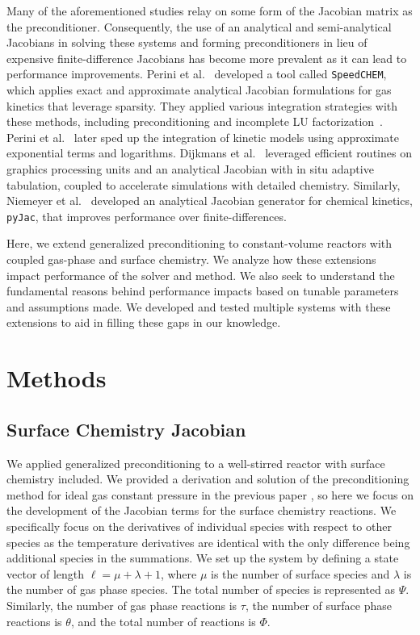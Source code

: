\documentclass[12pt]{ussci}
\def\nreactions{\Phi}
\def\gasreactions{\tau}
\def\surfreactions{\theta}
\def\nspecies{\Psi}
\def\gasspecies{\lambda}
\def\surfspecies{\mu}
\begin{document}
Many of the aforementioned studies relay on some form of the Jacobian matrix as the preconditioner.
Consequently, the use of an analytical and semi-analytical Jacobians in solving these systems and forming preconditioners in lieu of expensive finite-difference Jacobians has become more prevalent as it can lead to performance improvements.
Perini et al.~\cite{perini_analytical_2012} developed a tool called \texttt{SpeedCHEM}, which applies exact and approximate analytical Jacobian formulations for gas kinetics that leverage sparsity.
They applied various integration strategies with these methods, including preconditioning and incomplete LU factorization~\cite{perini_study_2014}.
Perini et al.~\cite{perini_fast_2018} later sped up the integration of kinetic models using approximate exponential terms and logarithms.
Dijkmans et al.~\cite{dijkmans_gpu_2014} leveraged efficient routines on graphics processing units and an analytical Jacobian with in situ adaptive tabulation, coupled to accelerate simulations with detailed chemistry.
Similarly, Niemeyer et al.~\cite{niemeyer_pyjac_2017} developed an analytical Jacobian generator for chemical kinetics, \texttt{pyJac}, that improves performance over finite-differences.

Here, we extend generalized preconditioning to constant-volume reactors with coupled gas-phase and surface chemistry.
We analyze how these extensions impact performance of the solver and method.
We also seek to understand the fundamental reasons behind performance impacts based on tunable parameters and assumptions made.
We developed and tested multiple systems with these extensions to aid in filling these gaps in our knowledge.

\section{Methods}
\label{p1:methods-section}

\subsection{Surface Chemistry Jacobian}

We applied generalized preconditioning to a well-stirred reactor with surface chemistry included.
We provided a derivation and solution of the preconditioning method for ideal gas constant pressure in the previous paper \cite{walker2022generalized}, so here we focus on the development of the Jacobian terms for the surface chemistry reactions.
We specifically focus on the derivatives of individual species with respect to other species as the temperature derivatives are identical with the only difference being additional species in the summations.
We set up the system by defining a state vector of length $\ell = \surfspecies + \gasspecies + 1$, where $\surfspecies$ is the number of surface species and $\gasspecies$ is the number of gas phase species. 
The total number of species is represented as $\nspecies$.
Similarly, the number of gas phase reactions is $\gasreactions$, the number of surface phase reactions is $\surfreactions$, and the total number of reactions is $\nreactions$.
\end{document}
